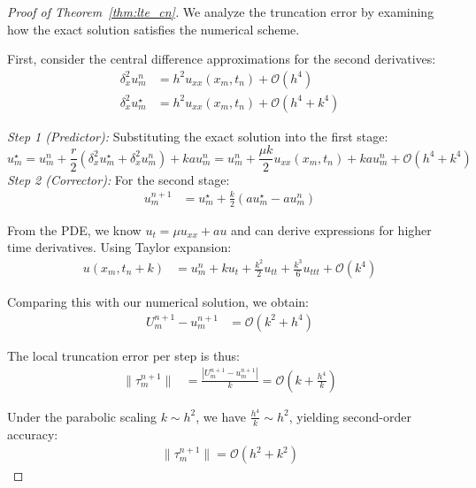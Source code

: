 \begin{proof}[Proof of Theorem~\ref{thm:lte_cn}]
  We analyze the truncation error by examining how the exact solution satisfies the numerical scheme.

  First, consider the central difference approximations for the second derivatives:
  \begin{align*}
    \delta_x^2 u_m^n     & = h^2u_{xx}(x_m,t_n) + \mathcal{O}(h^4)       \\
    \delta_x^2 u_m^\star & = h^2u_{xx}(x_m,t_n) + \mathcal{O}(h^4 + k^4)
  \end{align*}

  \textit{Step 1 (Predictor):} Substituting the exact solution into the first stage:
  \begin{equation}
    u_m^\star = u_m^n + \frac{r}{2}\left(\delta_x^2 u_m^\star + \delta_x^2 u_m^n\right) + kau_m^n = u_m^n + \frac{\mu k}{2}u_{xx}(x_m,t_n) + kau_m^n + \mathcal{O}(h^4 + k^4)
  \end{equation}
  \textit{Step 2 (Corrector):} For the second stage:
  \begin{align*}
    u_m^{n+1} & = u_m^\star + \frac{k}{2}(au_m^\star - au_m^n)
  \end{align*}

  From the PDE, we know $u_t = \mu u_{xx} + au$ and can derive expressions for higher time derivatives. Using Taylor expansion:
  \begin{align*}
    u(x_m,t_n+k) & = u_m^n + ku_t + \frac{k^2}{2}u_{tt} + \frac{k^3}{6}u_{ttt} + \mathcal{O}(k^4)
  \end{align*}

  Comparing this with our numerical solution, we obtain:
  \begin{align*}
    U_m^{n+1} - u_m^{n+1} & = \mathcal{O}(k^2 + h^4)
  \end{align*}

  The local truncation error per step is thus:
  \begin{align*}
    \|\tau_m^{n+1}\| & = \frac{|U_m^{n+1} - u_m^{n+1}|}{k} = \mathcal{O}\left(k + \frac{h^4}{k}\right)
  \end{align*}

  Under the parabolic scaling $k \sim h^2$, we have $\frac{h^4}{k} \sim h^2$, yielding second-order accuracy:
  \begin{align*}
    \|\tau_m^{n+1}\| = \mathcal{O}(h^2 + k^2)
  \end{align*}
\end{proof}

